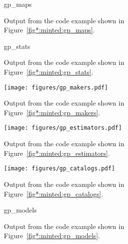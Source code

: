 \documentclass[longauth]{aa}
\begin{document}
\begin{figure}[!ht]
        \small
        {gp_maps}
        \caption{Output from the code example shown in Figure~\ref{fig*:minted:gp_maps}.}
        \label{fig:code_example_gp_maps}
\end{figure}


\begin{figure}[!ht]
        \small
        {gp_stats}
        \caption{Output from the code example shown in Figure~\ref{fig*:minted:gp_stats}.}
        \label{fig:code_example_gp_stats}
\end{figure}


\begin{figure*}[!ht]
        \centering
        \texttt{[image: figures/gp\_makers.pdf]}
        \caption{Output from the code example shown in Figure~\ref{fig*:minted:gp_makers}.}
        \label{fig:code_example_gp_makers}
\end{figure*}


\begin{figure*}[!ht]
        \centering
        \texttt{[image: figures/gp\_estimators.pdf]}
        \caption{Output from the code example shown in Figure~\ref{fig*:minted:gp_estimators}.}
        \label{fig:code_example_gp_estimators}
\end{figure*}


\begin{figure*}[!ht]
        \centering
        \texttt{[image: figures/gp\_catalogs.pdf]}
        \caption{Output from the code example shown in Figure~\ref{fig*:minted:gp_catalogs}.}
        \label{fig:code_example_gp_catalogs}
\end{figure*}

\begin{figure}[!ht]
        \small
        {gp_models}
        \caption{Output from the code example shown in Figure~\ref{fig*:minted:gp_models}.}
        \label{fig:code_example_gp_models}
\end{figure}
\end{document}
